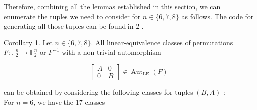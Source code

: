 \documentclass[10pt]{article}
\begin{document}
Therefore, combining all the lemmas established in this section, we can enumerate the tuples we need to consider for $n \in\{6,7,8\}$ as follows. The code for generating all those tuples can be found in 2 .

Corollary 1. Let $n \in\{6,7,8\}$. All linear-equivalence classes of permutations $F: \mathbb{F}_{2}^{n} \rightarrow \mathbb{F}_{2}^{n}$ or $F^{-1}$ with a non-trivial automorphism

$$
\left[\begin{array}{cc}
A & 0 \\
0 & B
\end{array}\right] \in \operatorname{Aut}_{\mathrm{LE}}(F)
$$

can be obtained by considering the following classes for tuples $(B, A)$ :\\
For $n=6$, we have the 17 classes
\end{document}
